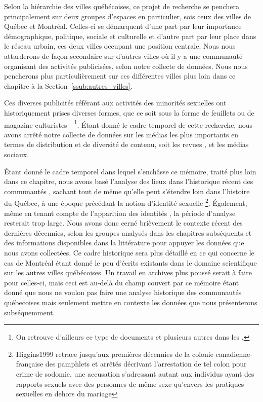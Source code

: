 Selon la hiérarchie des villes québécoises, ce projet de recherche se penchera principalement sur deux groupes d'espaces en particulier, sois ceux des villes de Québec et Montréal.
Celles-ci se démarquent d'une part par leur importance démographique, politique, sociale et culturelle et d'autre part par leur place dans le réseau urbain, ces deux villes occupant une position centrale.
Nous nous attarderons de façon secondaire sur d'autres villes où il y a une communauté \lgbt{} organisant des activités publicisées, selon notre collecte de données.
Nous nous pencherons plus particulièrement sur ces différentes villes plus loin dans ce chapitre à la Section~\ref{ssub:autres_villes}.

Ces diverses publicités référant aux activités des minorités sexuelles ont historiquement prises diverses formes, que ce soit sous la forme de feuillets ou de magazine culturistes~\citep{Higgins1999}~\footnote{On retrouve d'ailleurs ce type de documents et plusieurs autres dans les \agq{}.}.
Étant donné le cadre temporel de cette recherche, nous avons arrêté notre collecte de données sur les médias les plus importants en termes de distribution et de diversité de contenu, soit les revues \fugues{}, \sortie{} et les médias sociaux.

Étant donné le cadre temporel dans lequel s’enchâsse ce mémoire, traité plus loin dans ce chapitre, nous avons basé l'analyse des lieux dans l'historique récent des communautés \lgbt{}, sachant tout de même qu'elle peut s'étendre loin dans l'histoire du Québec, à une époque précédant la notion d'identité sexuelle \footnote{\citet{}{Higgins1999} retrace jusqu'aux premières décennies de la colonie canadienne-française des pamphlets et arrêtés décrivant l'arrestation de tel colon pour crime de sodomie, une accusation s'adressant autant aux individus ayant des rapports sexuels avec des personnes de même sexe qu'envers les pratiques sexuelles en dehors du mariage}.
Également, même en tenant compte de l'apparition des identités \lgbt{}, la période d'analyse resterait trop large.
Nous avons donc cerné brièvement le contexte récent des dernières décennies, selon les groupes analysés dans les chapitres subséquents et des informations disponibles dans la littérature pour appuyer les données que nous avons collectées.
Ce cadre historique sera plus détaillé en ce qui concerne le cas de Montréal étant donné le peu d'écrits existants dans le domaine scientifique sur les autres villes québécoises.
Un travail en archives plus poussé serait à faire pour celles-ci, mais ceci est au-delà du champ couvert par ce mémoire étant donné que nous ne voulon pas faire une analyse historique des communautés \lgbt{} québecoises mais seulement mettre en contexte les données que nous présenterons subséquemment.


